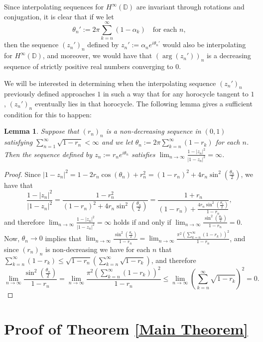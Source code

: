 \documentclass[preprint,12pt,number]{elsarticle}
\newtheorem{lemma}[theorem]{Lemma}
\newcommand{\D}{\mathbb{D}}
\begin{document}
Since interpolating sequences for $H^\infty(\D)$ are invariant through rotations and conjugation, it is clear that if we let 
\[
\theta_n':=2\pi\sum_{k=n}^{\infty}(1-\alpha_k)\quad \text{for each } n,
\] 
then the sequence $(z_n')_n$ defined by $z_n':=\alpha_ne^{i\theta_n'}$ would also be interpolating for $H^\infty(\D)$, and moreover, we would have that $(\arg(z_n'))_n$ is a decreasing sequence of strictly positive real numbers converging to $0$. 

We will be interested in determining when the interpolating sequence $(z_n')_n$ previously defined approaches $1$ in such a way that for any horocycle tangent to $1$, $(z_n')_n$ eventually lies in that horocycle. The following lemma gives a sufficient condition for this to happen:

\begin{lemma}\label{lema-naft}
    Suppose that $(r_n)_n$ is a non-decreasing sequence in $(0,1)$ satisfying $\sum_{n=1}^\infty\sqrt{1-r_n}<\infty$ and we let $\theta_n:=2\pi\sum_{k=n}^{\infty}(1-r_k)$ for each $n$. Then the sequence defined by $z_n:=r_ne^{i\theta_n}$ satisfies $\lim_{n\rightarrow\infty}\frac{1-|z_n|^2}{|1-z_n|^2}=\infty$.
\end{lemma}
\begin{proof}
Since $|1-z_n|^2=1-2r_n\cos(\theta_n)+r_n^2=(1-r_n)^2+4r_n\sin^2(\frac{\theta_n}{2})$, we have that 
\[
\frac{1-|z_n|^2}{|1-z_n|^2}=\frac{1-r_n^2}{(1-r_n)^2+4r_n\sin^2(\frac{\theta_n}{2})}=\frac{1+r_n}{(1-r_n)+\frac{4r_n\sin^2(\frac{\theta_n}{2})}{1-r_n}},
\] 
and therefore $\lim_{n\rightarrow\infty}\frac{1-|z_n|^2}{|1-z_n|^2}=\infty$ holds if and only if $\lim_{n\rightarrow\infty}\frac{\sin^2(\frac{\theta_n}{2})}{1-r_n}=0$. Now, $\theta_n\rightarrow0$ implies that $\lim_{n\rightarrow\infty}\frac{\sin^2(\frac{\theta_n}{2})}{1-r_n}=\lim_{n\rightarrow\infty}\frac{\pi^2 \left(\sum_{k=n}^\infty (1-r_k)\right)^2}{1-r_n}$, and since $(r_n)_n$ is non-decreasing we have for each $n$ that $\sum_{k=n}^\infty (1-r_k)\leq \sqrt{1-r_n}\left(\sum_{k=n}^\infty \sqrt{1-r_k}\right)$, and therefore 
\[
\lim_{n\rightarrow\infty}\frac{\sin^2(\frac{\theta_n}{2})}{1-r_n}=\lim_{n\rightarrow\infty}\frac{\pi^2 \left(\sum_{k=n}^\infty (1-r_k)\right)^2}{1-r_n}\leq \lim_{n\rightarrow\infty} \left(\sum_{k=n}^\infty \sqrt{1-r_k}\right)^2=0.
\]
\end{proof}

\section{Proof of Theorem \ref{Main Theorem}}\label{Section-3}
\vspace{0.3cm}
\end{document}

